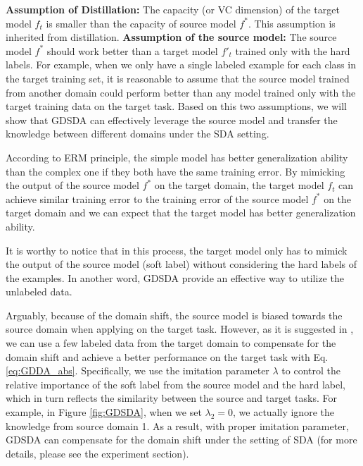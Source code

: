 \textbf{Assumption of Distillation:} The capacity (or VC dimension) of the target model $f_t$ is smaller than the capacity of source model $f^*$. This assumption is inherited from distillation.
\textbf{Assumption of the source model:} The source model $f^*$ should work better than a target model $f'_t$ trained only with the hard labels. For example, when we only have a single labeled example for each class in the target training set, it is reasonable to assume that the source model trained from another domain could perform better than any model trained only with the target training data on the target task. Based on this two assumptions, we will show that GDSDA can effectively leverage the source model and transfer the knowledge between different domains under the SDA setting.

According to ERM principle\cite{vapnik1999overview}, the simple model has better generalization ability than the complex one if they both have the same training error.
By mimicking the output of the source model $f^*$ on the target domain, the target model $f_t$ can achieve similar training error to the training error of the source model $f^*$ on the target domain and we can expect that the target model has better generalization ability.

It is worthy to notice that in this process, the target model only has to mimick the output of the source model (soft label) without considering the hard labels of the examples. In another word, GDSDA provide an effective way to utilize the unlabeled data.

Arguably, because of the domain shift, the source model is biased towards the source domain when applying on the target task. However, as it is suggested in \cite{hinton2015distilling}, we can use a few labeled data from the target domain to compensate for the domain shift and achieve a better performance on the target task with Eq. \eqref{eq:GDDA_abs}. Specifically, we use the imitation parameter $\lambda$ to control the relative importance of the soft label from the source model and the hard label, which in turn reflects the similarity between the source and target tasks. 
For example, in Figure \ref{fig:GDSDA}, when we set $\lambda_2=0$, we actually ignore the knowledge from source domain 1.
As a result, with proper imitation parameter, GDSDA can compensate for the domain shift under the setting of SDA (for more details, please see the experiment section).

